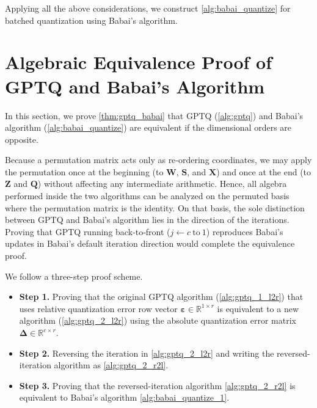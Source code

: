 \documentclass{article} %
\begin{document}
Applying all the above considerations, we construct \cref{alg:babai_quantize} for batched quantization using Babai's algorithm.

\clearpage

\clearpage

\section{Algebraic Equivalence Proof of GPTQ and Babai's Algorithm}
\label{sec:app_proof_gptq_babai}

In this section, we prove \cref{thm:gptq_babai} that GPTQ (\cref{alg:gptq}) and Babai's algorithm (\cref{alg:babai_quantize}) are equivalent if the dimensional orders are opposite.

Because a permutation matrix acts only as re‑ordering coordinates, we may apply the permutation once at the beginning (to $\bm{W}$, $\bm{S}$, and $\bm{X}$) and once at the end (to $\bm{Z}$ and $\bm{Q}$) without affecting any intermediate arithmetic.
Hence, all algebra performed inside the two algorithms can be analyzed on the permuted basis where the permutation matrix is the identity.
On that basis, the sole distinction between GPTQ and Babai's algorithm lies in the direction of the iterations.
Proving that GPTQ running back‑to‑front ($j \leftarrow c \mathrm{\ to\ } 1$) reproduces Babai's updates in Babai's default iteration direction would complete the equivalence proof.

We follow a three-step proof scheme.
\begin{itemize}
\item \textbf{Step 1.}
Proving that the original GPTQ algorithm (\cref{alg:gptq_1_l2r}) that uses relative quantization error row vector $\bm{\varepsilon} \in \mathbb{R}^{1 \times r}$ is equivalent to a new algorithm (\cref{alg:gptq_2_l2r}) using the absolute quantization error matrix $\bm{\Delta} \in \mathbb{R}^{c \times r}$.
\item \textbf{Step 2.}
Reversing the iteration in \cref{alg:gptq_2_l2r} and writing the reversed-iteration algorithm as \cref{alg:gptq_2_r2l}.
\item \textbf{Step 3.}
Proving that the reversed-iteration algorithm \cref{alg:gptq_2_r2l} is equivalent to Babai's algorithm \cref{alg:babai_quantize_1}.
\end{itemize}
\end{document}
